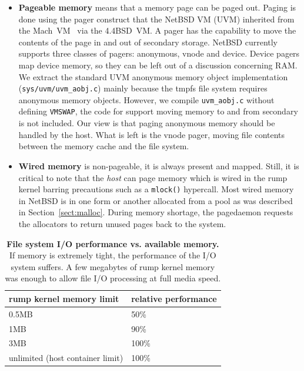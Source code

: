 \begin{itemize}
\item   \textbf{Pageable memory} means that a memory page can be
	paged out.  Paging is done using the pager construct that the
	NetBSD VM (UVM) inherited from the Mach~VM~\cite{rashid:machvm}
	via the 4.4BSD~VM.  A pager has the capability to move the
	contents of the page in and out of secondary storage.
	NetBSD currently supports three classes of pagers: anonymous,
	vnode and device.  Device pagers map device memory, so they
	can be left out of a discussion concerning RAM.  We extract
	the standard UVM anonymous memory object implementation
	(\verb+sys/uvm/uvm_aobj.c+) mainly because the tmpfs file
	system requires anonymous memory objects.  However, we
	compile \verb+uvm_aobj.c+ without defining \texttt{VMSWAP},
	\ie the code for support moving memory to and from secondary
	is not included.  Our view is that paging anonymous memory
	should be handled by the host.  What is left is the vnode pager,
	\ie moving file contents between the memory cache and the
	file system.

\item   \textbf{Wired memory} is non-pageable, \ie it is always present
	and mapped.  Still, it is critical to note that the
	\textit{host} can page memory which is wired in the rump
	kernel barring precautions such as a \texttt{mlock()}
	hypercall.  Most wired memory in NetBSD is in one form or
	another allocated from a pool as was described in
	Section~\ref{sect:malloc}.  During memory shortage, the
	pagedaemon requests the allocators to return unused pages
	back to the system.
\end{itemize}

\begin{table}
\begin{tabular}{|l|l|}
\hline
rump kernel memory limit & relative performance \\
\hline
\hline
0.5MB & 50\% \\
\hline
1MB & 90\% \\
\hline
3MB & 100\% \\
\hline
unlimited (host container limit) & 100\% \\
\hline
\end{tabular}
\caption[File system I/O performance vs. available memory]{
\textbf{File system I/O performance vs. available memory.} If memory
is extremely tight, the performance of the I/O system suffers.  A few
megabytes of rump kernel memory was enough to allow file I/O
processing at full media speed.
}
\label{tab:fileio}
\end{table}


